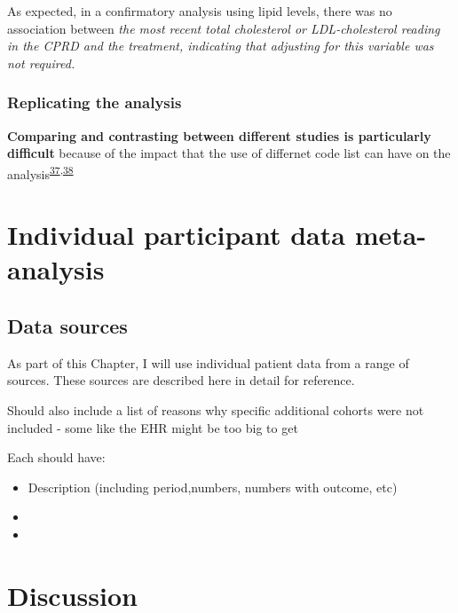 \documentclass[a4paper, twoside]{templates/ociamthesis}
\begin{document}
As expected, in a confirmatory analysis using lipid levels, there was no association between \emph{the most recent total cholesterol or LDL-cholesterol reading in the CPRD and the treatment, indicating that adjusting for this variable was not required.}

\hypertarget{replicating-the-analysis}{%
\subsection{Replicating the analysis}\label{replicating-the-analysis}}

\textbf{Comparing and contrasting between different studies is particularly difficult} because of the impact that the use of differnet code list can have on the analysis\textsuperscript{\protect\hyperlink{ref-wilkinson2018a}{37},\protect\hyperlink{ref-mcguinness2019c}{38}}



\hypertarget{ipd-heading}{%
\chapter{Individual participant data meta-analysis}\label{ipd-heading}}

\minitoc 

\hypertarget{data-sources}{%
\section{Data sources}\label{data-sources}}

As part of this Chapter, I will use individual patient data from a range of sources. These sources are described here in detail for reference.

Should also include a list of reasons why specific additional cohorts were not included - some like the EHR might be too big to get

Each should have:

\begin{itemize}
\item
  Description (including period,numbers, numbers with outcome, etc)
\item
\item
\end{itemize}

\hypertarget{discussion-2}{%
\chapter{Discussion}\label{discussion-2}}
\end{document}
